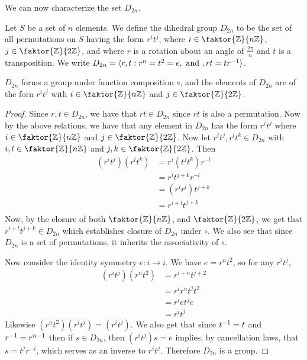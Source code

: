 We can now characterize the set $D_{2n}$.

\begin{definition}
  Let $S$ be a set of $n$ elements. We define the dihedral group
  $D_{2n}$ to be the set of all permutations on $S$ having the form $r^it^j$, where
  $i \in \faktor{\Z}{n\Z}$, $j \in \faktor{\Z}{2\Z}$, and where $r$ is
  a rotation about an angle of $\frac{2\pi}{n}$ and $t$ is a
  transposition. We write $D_{2n}=\langle r,t : r^n=t^2=e, \text{ and }, rt=tr^{-1}
  \rangle$.
\end{definition}

\begin{theorem}\label{theorem_1.2.2}
  $D_{2n}$ forms a group under function composition $\circ$, and the elements
  of $D_{2n}$ are of the forn $r^it^j$ with  $i \in \faktor{\Z}{n\Z}$ and $j
  \in \faktor{\Z}{2\Z}$.
\end{theorem}
\begin{proof}
  Since $r, t \in D_{2n}$, we have that $rt \in D_{2n}$ since $rt$ is also a
  permutation. Now by the above relations, we have that any element in
  $D_{2n}$ has the form $r^it^j$ where  $i \in \faktor{\Z}{n\Z}$ and $j \in
  \faktor{\Z}{2\Z}$. Now let $r^it^j, r^lt^k \in D_{2n}$ with $i,l \in
  \faktor{\Z}{n\Z}$ and $j,k \in \faktor{\Z}{2\Z}$. Then
  \begin{align*}
    (r^it^j)(r^lt^k)  &=  r^i(t^jt^k)r^{-l} \\
                      &=  r^it^{j+k}r^{-l}  \\
                      &=  (r^ir^l)t^{j+k} \\
                      &=  r^{i+l}t^{j+k}  \\
  \end{align*}
  Now, by the closure of both $\faktor{\Z}{n\Z}$, and
  $\faktor{\Z}{2\Z}$, we get that $r^{i+l}t^{j+k} \in D_{2n}$ which
  establishes closure of $D_{2n}$ under $\circ$. We also see that since
  $D_{2n}$ is a set of permutations, it inherits the associativity of $\circ$.

  Now consider the identity symmetry $e:i \rightarrow i$. We have $e=r^nt^2$,
  so for any  $r^it^j$,
  \begin{align*}
    (r^it^j)(r^nt^2)  &=  r^{i+n}t^{j+2}  \\
                      &=  r^ir^nt^jt^2  \\
                      &=  r^iet^je  \\
                      &=  r^it^j
  \end{align*}
  Likewise
  $(r^nt^2)(r^it^j)=(r^it^j)$. We also get that since $t^{-1}=t$ and
  $r^{-1}=r^{n-1}$ then if $s \in D_{2n}$, then $(r^it^j)s=e$ implies, by
  cancellation laws, that $s=t^jr^{-i}$, which serves as an inverse to
  $r^it^j$. Therefore  $D_{2n}$ is a group.
\end{proof}
